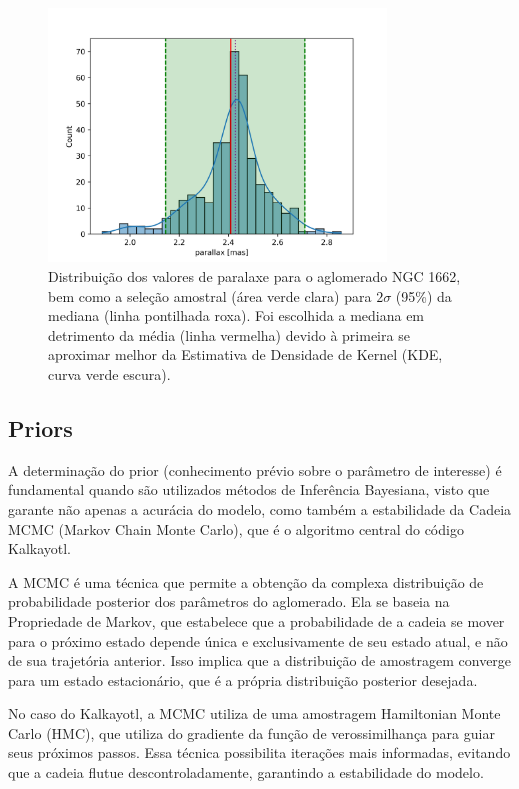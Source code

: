 \documentclass[12pt]{projeto}
\begin{document}
\begin{figure}[ht]
\centering
\includegraphics[width= 0.8\textwidth]{NGC1662_parallax.png}
\caption{\label{fig:selecao_amostral} Distribuição dos valores de paralaxe para o aglomerado NGC 1662, bem como a seleção amostral (área verde clara) para \(2\sigma\) (95\%) da mediana (linha pontilhada roxa). Foi escolhida a mediana em detrimento da média (linha vermelha) devido à primeira se aproximar melhor da Estimativa de Densidade de Kernel (KDE, curva verde escura).}
\end{figure}

\subsection{Priors}

A determinação do prior (conhecimento prévio sobre o parâmetro de interesse) é fundamental quando são utilizados métodos de Inferência Bayesiana, visto que garante não apenas a acurácia do modelo, como também a estabilidade da Cadeia MCMC (Markov Chain Monte Carlo), que é o algoritmo central do código Kalkayotl.

A MCMC é uma técnica que permite a obtenção da complexa distribuição de probabilidade posterior dos parâmetros do aglomerado. Ela se baseia na Propriedade de Markov, que estabelece que a probabilidade de a cadeia se mover para o próximo estado depende única e exclusivamente de seu estado atual, e não de sua trajetória anterior. Isso implica que a distribuição de amostragem converge para um estado estacionário, que é a própria distribuição posterior desejada.

No caso do Kalkayotl, a MCMC utiliza de uma amostragem Hamiltonian Monte Carlo (HMC), que utiliza do gradiente da função de verossimilhança para guiar seus próximos passos. Essa técnica possibilita iterações mais informadas, evitando que a cadeia flutue descontroladamente, garantindo a estabilidade do modelo. 
\end{document}
